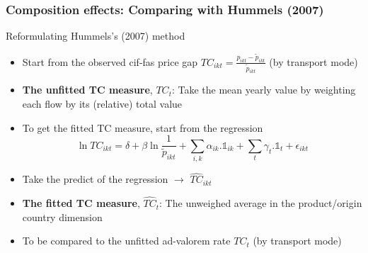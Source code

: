 \documentclass[10 pt,Helvetica, french]{beamer}
\begin{document}
\begin{frame}[label = app_compeffects_Hummels]
\frametitle{Composition effects: Comparing with Hummels (2007)}
Reformulating Hummels's (2007) method  \vspace{0.1cm}
\begin{itemize}
\item Start from the observed cif-fas price gap $TC_{ikt} = \frac{p_{ikt} - \widetilde{p}_{ikt}}{\widetilde{p}_{ikt}}$ (by transport mode) \vspace{0.1cm}
\item \textbf{The unfitted TC measure}, $TC_t$: Take the mean yearly value by weighting each flow by its (relative) total value \vspace{0.1cm}
\item To get the fitted TC measure, start from the regression \vspace{0.1cm}
\footnotesize
\begin{equation}
\ln TC_{ikt} = \delta+ \beta \ln \frac{1}{\widetilde{p}_{ikt}} + \sum_{i,k}\alpha_{ik}.\mathbb{1}_{ik}+ \sum_{t}\gamma_{t}.\mathbb{1}_{t} + \epsilon_{ikt}
\label{eq:hummels}\end{equation}
\normalsize
\item Take the predict of the regression $\rightarrow$ $\widehat{TC}_{ikt}$   \vspace{0.1cm}
\item \textbf{The fitted TC measure}, $\widehat{TC}_t$: The unweighed average in the product/origin country dimension   \vspace{0.1cm}
\item To be compared to the unfitted ad-valorem rate $TC_t$ (by transport mode)

\end{itemize}


\end{frame}
\end{document}
